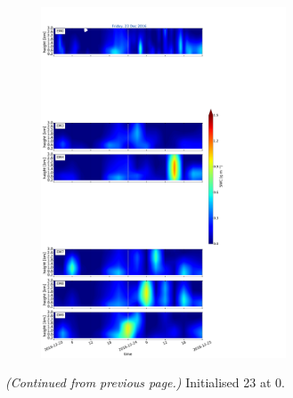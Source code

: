 \begin{figure}\ContinuedFloat
	\centering
	\begin{subfigure}[t]{\textwidth} 
		\centering
		\includegraphics[trim={0cm 0cm 18.3cm 5.1cm},clip,width=0.8\textwidth]{./fig_09EM/20161223}
		\caption{}\label{fig:EM09_23}
	\end{subfigure}
    \caption{\textit{(Continued from previous page.)} Initialised \SI{23}{\dec} at \SI{0}{\UTC}. } 
\end{figure}
